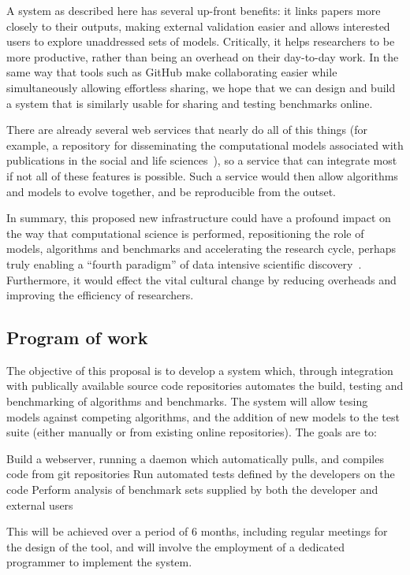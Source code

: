 \documentclass[a4paper,11pt]{article}
\begin{document}
A system as described here has several up-front benefits: it links
papers more closely to their outputs, making external validation
easier and allows interested users to explore unaddressed sets of
models. Critically, it helps researchers to be more productive, rather
than being an overhead on their day-to-day work. In the same way that
tools such as GitHub make collaborating easier while simultaneously
allowing effortless sharing, we hope that we can design and build a
system that is similarly usable for sharing and testing benchmarks
online.

There are already several web services that nearly do all of this
things (for example, a repository for disseminating the computational
models associated with publications in the social and life
sciences~\cite{rollins-et-al:2014}), so a service that can integrate
most if not all of these features is possible. Such a service would
then allow algorithms and models to evolve together, and be
reproducible from the outset.

In summary, this proposed new infrastructure could have a profound
impact on the way that computational science is performed,
repositioning the role of models, algorithms and benchmarks and
accelerating the research cycle, perhaps truly enabling a ``fourth
paradigm'' of data intensive scientific
discovery~\cite{hey:2009}. Furthermore, it would effect the vital
cultural change by reducing overheads and improving the efficiency of
researchers.

\subsection*{Program of work}

The objective of this proposal is to develop a system which, through
integration with publically available source code repositories automates
the build, testing and benchmarking of algorithms and benchmarks. The 
system will allow tesing models against competing algorithms, and the
addition of new models to the test suite (either manually or from existing
online repositories). The goals are to:


Build a webserver, running a daemon which automatically pulls, and compiles
code from git repositories
Run automated tests defined by the developers on the code
Perform analysis of benchmark sets supplied by both the developer and external
users

This will be achieved over a period of 6 months, including regular meetings
for the design of the tool, and will involve the employment of a dedicated 
programmer to implement the system.
\end{document}
